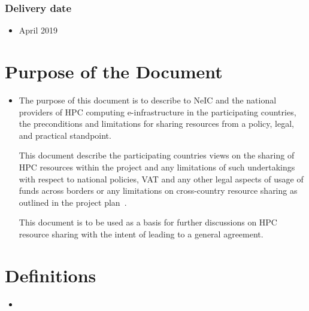 \documentclass{article}
\newcommand{\einfra}{e-infrastructure\xspace}
\newcommand{\np}{national provider\xspace}
\newcommand{\nps}{\np{s}\xspace}
\begin{document}
\subsubsection{Delivery date}
\begin{itemize}
    \item []
April 2019
\end{itemize}
\section{Purpose of the Document}
\begin{itemize}
    \item []
\label{sec-purpose}
The purpose of this document is to describe to NeIC and the \nps of HPC computing \einfra in the participating countries, the preconditions and limitations for sharing resources from a policy, legal, and practical standpoint.

This document describe the participating countries views on the sharing of HPC resources within the project and any limitations of such undertakings with respect to national policies, VAT and any other legal aspects of usage of funds across borders or any limitations on cross-country resource sharing as outlined in the project plan~\cite{dell-pp}.

This document is to be used as a basis for further discussions on HPC resource sharing with the intent of leading to a general agreement.
\end{itemize}
\section{Definitions}
\begin{itemize}
    \item []
\end{itemize}
\end{document}
